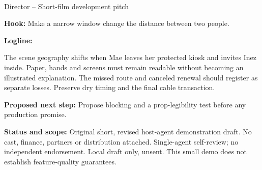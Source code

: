 \documentclass[11pt,letterpaper]{article}
\begin{document}
\begin{center}
{\Large\bfseries\sffamily \filmtitleupper}\\[6pt]
Director -- Short-film development pitch
\end{center}
\textbf{Hook:} Make a narrow window change the distance between two people.

\textbf{Logline:} \filmlogline

The scene geography shifts when Mae leaves her protected kiosk and invites Inez inside. Paper, hands and screens must remain readable without becoming an illustrated explanation. The missed route and canceled renewal should register as separate losses. Preserve dry timing and the final cable transaction.

\textbf{Proposed next step:} Propose blocking and a prop-legibility test before any production promise.

\textbf{Status and scope:} Original short, revised host-agent demonstration draft. No cast, finance, partners or distribution attached. Single-agent self-review; no independent endorsement. Local draft only, unsent. This small demo does not establish feature-quality guarantees.
\end{document}
